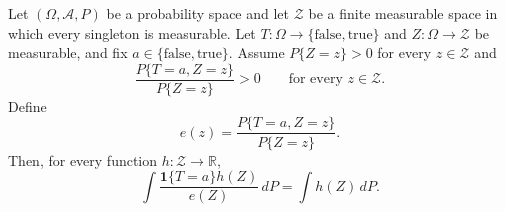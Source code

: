 \begin{theorem}
Let $(\Omega,\mathcal A,P)$ be a probability space and let $\mathcal Z$ be
a finite measurable space in which every singleton is measurable.  Let
$T:\Omega\to\{\mathrm{false},\mathrm{true}\}$ and
$Z:\Omega\to\mathcal Z$ be measurable, and fix
$a\in\{\mathrm{false},\mathrm{true}\}$.  Assume
$P\{Z=z\}>0$ for every $z\in\mathcal Z$ and
\[
  \frac{P\{T=a,Z=z\}}{P\{Z=z\}}>0
  \qquad\text{for every }z\in\mathcal Z.
\]
Define
\[
  e(z)=\frac{P\{T=a,Z=z\}}{P\{Z=z\}}.
\]
Then, for every function $h:\mathcal Z\to\mathbb R$,
\[
  \int \frac{\mathbf 1\{T=a\}h(Z)}{e(Z)}\,dP
  =
  \int h(Z)\,dP.
\]
\end{theorem}
